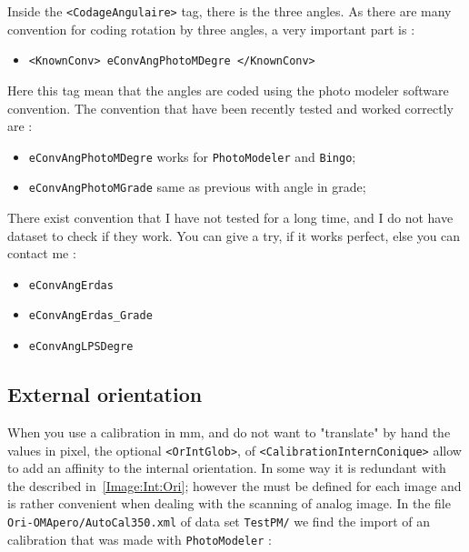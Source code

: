 Inside the {\tt  <CodageAngulaire>} tag, there is the three angles. As there are many
convention for coding rotation by three angles, a very important part is :

\begin{itemize}
      \item {\tt <KnownConv> eConvAngPhotoMDegre </KnownConv>}
\end{itemize}

Here this tag mean that the angles are coded using the photo modeler software convention.
The convention that have been recently tested and worked correctly are :


\begin{itemize}
      \item {\tt eConvAngPhotoMDegre}  works for {\tt PhotoModeler} and {\tt Bingo};
      \item {\tt eConvAngPhotoMGrade}  same as previous with angle in grade;
\end{itemize}

There exist convention that I have not tested for a long time, and I do not have dataset to
check if they work. You can give a try, if it works perfect, else you can contact me :

\begin{itemize}
    \item {\tt eConvAngErdas}
    \item {\tt eConvAngErdas\_Grade}
    \item {\tt eConvAngLPSDegre}
\end{itemize}


\subsection{External orientation}

When you use a calibration in mm, and do not want to "translate" by hand the values
in pixel, the optional {\tt <OrIntGlob>},  of {\tt <CalibrationInternConique>} allow
to add an affinity to the internal orientation. In some way it is redundant with the 
{\tt <OrIntImaM2C>} described in~\ref{Image:Int:Ori}; however the {\tt <OrIntImaM2C>} 
must be defined for each image and is rather convenient when dealing with the 
scanning of analog image. In the file {\tt  Ori-OMApero/AutoCal350.xml} of  data set
{\tt TestPM/}  we find the import of an calibration that was made with {\tt PhotoModeler} :

